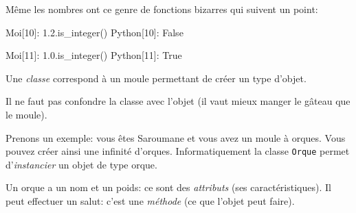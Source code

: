 \documentclass[french]{beamer}
\begin{document}
\begin{frame}[fragile]
  
Même les nombres ont ce genre de \og fonctions\fg{} bizarres qui suivent un
point:

\pause

\begin{pythoncode}
Moi[10]: 1.2.is_integer()
Python[10]: False

Moi[11]: 1.0.is_integer()
Python[11]: True
\end{pythoncode}


  
\end{frame}



\begin{frame}
  

Une \textit{classe} correspond à un \og moule\fg{} permettant de créer
un type d'objet.

Il ne faut pas confondre la classe avec l'objet (il vaut mieux manger
le gâteau que le moule).

\end{frame}


\begin{frame}
  
Prenons  un exemple:  vous  êtes Saroumane  et vous  avez  un moule  à
orques.     Vous      pouvez     créer     ainsi      une     infinité
d'orques.   Informatiquement    la   classe    \texttt{Orque}   permet
d'\textit{instancier} un objet de type orque.


\pause


Un orque a un nom et un poids: ce sont des \textit{attributs} (ses caractéristiques). Il peut
effectuer un salut: c'est une \textit{méthode} (ce que l'objet peut faire).

\end{frame}




\begin{frame}
  \begin{center}
\end{center}
\end{frame}
\end{document}
